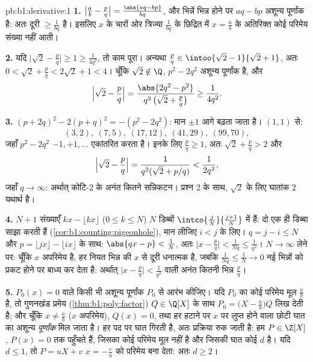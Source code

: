 \begin{solution}{pb:b1:derivative:1}
\textbf{1.} $\bigl|\frac ab - \frac pq\bigr| = \frac{\abs{aq - bp}}{bq}$, और
भिन्नें भिन्न होने पर $aq - bp$ अशून्य पूर्णांक है: अतः दूरी $\geq
\frac{1}{bq}$ है। इसलिए $x$ के चारों ओर त्रिज्या $\frac{1}{bq}$ के छिद्रित
 में $x = \frac ab$ के अतिरिक्त कोई परिमेय संख्या नहीं आती।

\textbf{2.} यदि $\bigl|\sqrt2 - \frac pq\bigr| \geq 1 \geq \frac{1}{4q^2}$,
तो काम पूरा। अन्यथा $\frac pq \in \intoo{\sqrt2 - 1}{\sqrt2 + 1}$, अतः $0 <
\sqrt2 + \frac pq < 2\sqrt2 + 1 < 4$। चूँकि $\sqrt 2 \notin \Q$, $p^2 -
2q^2$ अशून्य पूर्णांक है, और
\[
\Bigl|\sqrt2 - \frac pq\Bigr|
= \frac{\abs{2q^2 - p^2}}{q^2\,\bigl(\sqrt2 + \frac pq\bigr)}
\geq \frac{1}{4q^2} .
\]

\textbf{3.} $(p + 2q)^2 - 2(p + q)^2 = -(p^2 - 2q^2)$: मान $\pm1$ आगे बढ़ता
जाता है। $(1,1)$ से:
\[
(3,2),\ (7,5),\ (17,12),\ (41,29),\ (99,70),
\]
जहाँ $p^2 - 2q^2$ $-1, +1, \dots$ एकांतरित करता है। इनके लिए $\frac pq \geq
1$, अतः $\sqrt2 + \frac pq > 2$ और
\[
\Bigl|\sqrt2 - \frac pq\Bigr| =
\frac{1}{q^2(\sqrt2 + p/q)} < \frac{1}{2q^2} ,
\]
जहाँ $q \to \infty$: अर्थात् कोटि-$2$ के अनंत कितने सन्निकटन। प्रश्न 2 के
साथ, $\sqrt 2$ के लिए घातांक $2$ यथार्थ है।

\textbf{4.} $N + 1$ संख्याएँ $kx - \lfloor kx\rfloor$ ($0 \leq k \leq N$)
$N$ डिब्बों $\intco{\frac jN}{\frac{j+1}{N}}$ में हैं: दो एक ही डिब्बा साझा
करती हैं (\cref{cor:b1:counting:pigeonhole}), मान लीजिए $i < j$ के लिए। $q =
j - i \leq N$ और $p = \lfloor jx\rfloor - \lfloor ix\rfloor$ के साथ:
$\abs{qx - p} < \frac1N$, अतः $\bigl|x - \frac pq\bigr| < \frac{1}{Nq} \leq
\frac{1}{q^2}$। $N \to \infty$ लेने पर: चूँकि $x$ अपरिमेय है, हर नियत भिन्न
की $x$ से दूरी धनात्मक है, जबकि $\frac{1}{Nq} \leq \frac 1N \to 0$ नई
भिन्नों को प्रकट होने पर बाध्य कर देता है: अर्थात् $\bigl|x - \frac pq\bigr|
< \frac{1}{q^2}$ वाली अनंत कितनी भिन्न $\frac pq$।

\textbf{5.} $P_0(x) = 0$ वाले किसी भी अशून्य पूर्णांक $P_0$ से आरंभ कीजिए।
यदि $P_0$ का कोई परिमेय मूल $\frac ab$ है, तो गुणनखंड प्रमेय
(\cref{thm:b1:poly:factor}) $Q \in \Q[X]$ के साथ $P_0 = \bigl(X - \frac
ab\bigr)Q$ लिख देती है; और चूँकि $x \neq \frac ab$ ($x$ अपरिमेय), $Q(x) =
0$, तथा हर हटाने पर $x$ पर लुप्त होने वाला छोटी घात का अशून्य
\emph{पूर्णांक}  मिल जाता है। हर पद पर घात गिरती है, अतः प्रक्रिया रुक
जाती है: हम $P \in \Z[X]$, $P(x) = 0$ तक पहुँचते हैं, जिसका कोई परिमेय मूल
नहीं है और जिसकी घात कोई $d$ है। यदि $d \leq 1$, तो $P = uX + v$ $x = -\frac
vu$ को परिमेय बना देता: अतः $d \geq 2$।


\end{solution}
